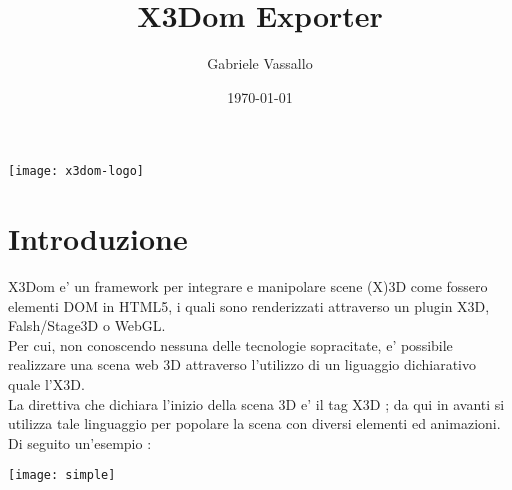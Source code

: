 \documentclass[11pt]{article}
\title{X3Dom Exporter}
\date{\today}
\author{Gabriele Vassallo}
\begin{document}
    \maketitle 
    \vspace{4cm}
\begin{center} \texttt{[image: x3dom-logo]} \end{center}

\clearpage 
\tableofcontents
\clearpage 

\section{Introduzione}
X3Dom e' un framework per integrare e manipolare scene (X)3D come fossero elementi DOM in HTML5, i quali sono renderizzati attraverso un plugin X3D, Falsh/Stage3D o WebGL. \\
Per cui, non conoscendo nessuna delle tecnologie sopracitate, e' possibile realizzare una scena web 3D attraverso l'utilizzo di un liguaggio dichiarativo quale l'X3D. \\
La direttiva che dichiara l'inizio della scena 3D e' il tag X3D ; da qui in avanti si utilizza tale linguaggio per popolare la scena con diversi elementi ed animazioni. 
Di seguito un'esempio : 

\vspace{10mm}
\small 
\begin{center} \texttt{[image: simple]}\end{center}
\clearpage
\end{document}
